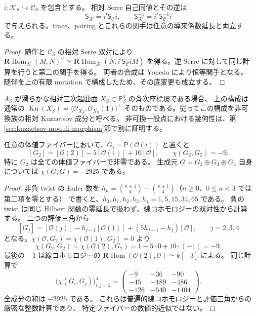 \begin{corollary}
\label{cor:relative-kuznetsov-serre}
$i:\mathcal K_S\hookrightarrow\mathcal C_S$ を包含とする。
相対 Serre 自己同値とその逆は
\[
 \mathsf S_{\mathcal K}=i^!\mathsf S_{\mathcal C}i,
 \qquad \mathsf S_{\mathcal K}^{-1}=i^*\mathsf S_{\mathcal C}^{-1}i
\]
で与えられる。trace、pairing とこれらの関手は任意の導来係数延長と両立する。
\end{corollary}
\begin{proof}
随伴と $\mathcal C_S$ の相対 Serre 双対により
$\mathbf R\operatorname{Hom}_{\mathcal K}(M,N)^\vee
 \simeq\mathbf R\operatorname{Hom}_{\mathcal K}(N,i^!\mathsf S_{\mathcal C}iM)$
を得る。逆 Serre に対して同じ計算を行うと第二の関手を得る。
両者の合成は Yoneda により恒等関手となる。
随伴を上の有限 mutation で構成したため、その底変更も成立する。
\end{proof}

\begin{remark}[可換ファイバー]
$A_S$ が滑らかな相対三次超曲面 $X_S\subset\mathbb P^4_S$ の斉次座標環である場合、
上の構成は通常の
$\operatorname{Ku}(X_S)=\langle\mathcal O_{X_S},\mathcal O_{X_S}(1)\rangle^\perp$
そのものである。従ってこの構成を非可換族の相対 Kuznetsov 成分と呼べる。
非可換一般点における幾何性は、第\ref{sec:kuznetsov-moduli-morphism}節で別に証明する。
\end{remark}

\begin{lemma}
\label{lem:relative-kuznetsov-nonzero-euler}
任意の体値ファイバーにおいて、$G_i=\mathsf P(\mathcal O(i))$ と置くと
\[
 [G_2]=[\mathcal O(2)]-5[\mathcal O(1)]+10[\mathcal O],
 \qquad\chi(G_2,G_2)=-9.
\]
特に $G_2$ は全ての体値ファイバーで非零である。
生成元 $G=G_2\oplus G_3\oplus G_4$ 自身については
$\chi(G,G)=-2925$ である。
\end{lemma}
\begin{proof}
非負 twist の Euler 数を
$h_n=\binom{n+4}{4}-\binom{n+1}{4}$（$n\ge0$、$0\le n<3$ では第二項を零とする）
で書くと、$h_0,h_1,h_2,h_3,h_4=1,5,15,34,65$ である。
負の twist は同じ Hilbert 関数の零延長で扱わず、線コホモロジーの双対性から計算する。
二つの評価三角から
\[
 [G_j]=[\mathcal O(j)]-h_{j-1}[\mathcal O(1)]
           +(5h_{j-1}-h_j)[\mathcal O],\qquad j=2,3,4
\]
となる。$\chi(\mathcal O,G_2)=\chi(\mathcal O(1),G_2)=0$ より
\[
 \chi(G_2,G_2)=\chi(\mathcal O(2),G_2)
   =1-5\cdot0+10\cdot(-1)=-9.
\]
最後の $-1$ は線コホモロジーの
$\mathbf R\operatorname{Hom}(\mathcal O(2),\mathcal O)\simeq k[-3]$ による。
同じ計算で
\[
 \bigl(\chi(G_i,G_j)\bigr)_{i,j=2}^4
 =\begin{pmatrix}-9&-36&-90\\-45&-189&-486\\-126&-540&-1404\end{pmatrix}.
\]
全成分の和は $-2925$ である。
これらは普遍的線コホモロジーと評価三角からの厳密な整数計算であり、
特定ファイバーの数値的近似ではない。
\end{proof}

